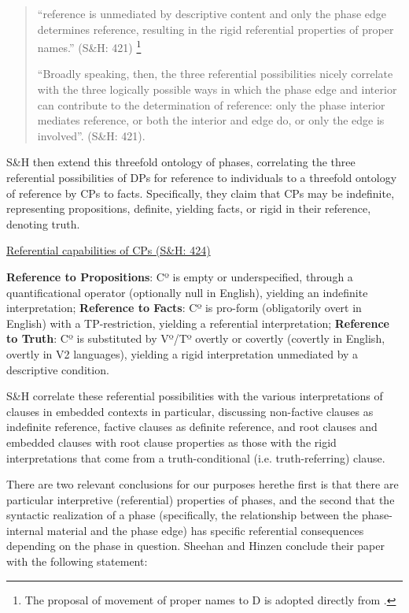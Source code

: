 \documentclass[output=paper
,modfonts
,nonflat
]{langsci/langscibook}
\begin{document}
\begin{quote}

``reference is unmediated by descriptive content and only the phase edge determines reference, resulting in the rigid referential properties of proper names.'' (S\&H: 421) \footnote{The proposal of movement of proper names to D is adopted directly from \citet{Longobardi:1994,Longobardi:2005}.}  

``Broadly speaking, then, the three referential possibilities nicely correlate with the three logically possible ways in which the phase edge and interior can contribute to the determination of reference: only the phase interior mediates reference, or both the interior and edge do, or only the edge is involved''. (S\&H: 421).

\end{quote}
\noindent S\&H then extend this threefold ontology of phases, correlating the three referential possibilities of DPs for reference to individuals to a threefold ontology of reference by CPs to facts. Specifically, they claim that CPs may be indefinite, representing propositions, definite, yielding facts, or rigid in their reference, denoting truth. 

\ea \underline{Referential capabilities of CPs (S\&H: 424)} \\

\begin{xlist}
\ex \textbf{Reference to Propositions}: Cº is empty or underspecified, through a quantificational operator (optionally null in English), yielding an indefinite interpretation; 
\ex \textbf{Reference to Facts}: Cº is pro-form (obligatorily overt in English) with a TP-restriction, yielding a referential interpretation;
\ex \textbf{Reference to Truth}: Cº is substituted by Vº/Tº overtly or covertly (covertly in English, overtly in V2 languages), yielding a rigid interpretation unmediated by a descriptive condition.
\end{xlist}
\z
\noindent S\&H correlate these referential possibilities with the various interpretations of clauses in embedded contexts in particular, discussing non-factive clauses as indefinite reference, factive clauses as definite reference, and root clauses and embedded clauses with root clause properties as those with the rigid interpretations that come from a truth-conditional (i.e. truth-referring) clause. 

There are two relevant conclusions for our purposes here\textemdash the first is that there are particular interpretive (referential) properties of phases, and the second that the syntactic realization of a phase (specifically, the relationship between the phase-internal material and the phase edge) has specific referential consequences depending on the phase in question. Sheehan and Hinzen conclude their paper with the following statement: 
\end{document}
